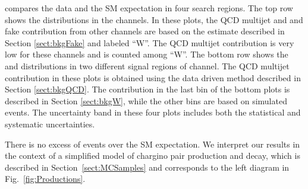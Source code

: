 compares the data and the SM expectation in four search regions. The top row 
shows the \mttwo distributions in the \leptonTau channels. 
In these plots, the QCD multijet and \wjets and fake contribution from other channels 
are based on the estimate described in Section \ref{sect:bkgFake} and labeled ``W''.
The QCD multijet contribution is very low for these channels and is counted among ``W''.
The bottom row shows the \mttwo and \SumMT distributions in two different signal regions of \tauTau channel. 
The QCD multijet contribution in these plots is obtained using the data driven method described in 
Section \ref{sect:bkgQCD}. The \wjets contribution in 
the last bin of the bottom plots is described in Section \ref{sect:bkgW}, while the other bins are based on simulated events.
The uncertainty band in these four plots includes both the statistical and systematic uncertainties.

There is no excess of events over the SM expectation.  We interpret our results in the context
of a simplified model of chargino pair production and decay, which is described in Section~\ref{sect:MCSamples} and corresponds 
to the left diagram in Fig.~\ref{fig:Productions}. 

